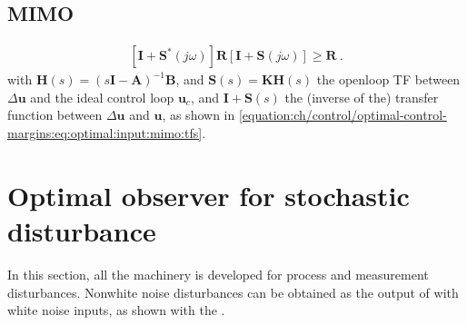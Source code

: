 \documentclass[letterpaper,10pt,english]{jupyterBook}
\begin{document}
\subsection{MIMO}
\label{\detokenize{ch/control/optimal-control-margins:mimo}}\label{\detokenize{ch/control/optimal-control-margins:control-optimal-margins-mimo}}\begin{equation*}
\begin{split}\left[ \mathbf{I} + \mathbf{S}^*(j \omega) \right] \mathbf{R} \left[ \mathbf{I} + \mathbf{S}(j \omega) \right] \ge \mathbf{R} \ .\end{split}
\end{equation*}
\sphinxAtStartPar
with \(\mathbf{H}(s) = (s \mathbf{I} - \mathbf{A})^{-1} \mathbf{B}\), and \(\mathbf{S}(s) = \mathbf{K} \mathbf{H}(s)\) the open\sphinxhyphen{}loop TF between \(\Delta \mathbf{u}\) and the ideal control loop \(\mathbf{u}_c\), and \(\mathbf{I} + \mathbf{S}(s)\) the (inverse of the) transfer function between \(\Delta \mathbf{u}\) and \(\mathbf{u}\), as shown in \eqref{equation:ch/control/optimal-control-margins:eq:optimal:input:mimo:tfs}.

\sphinxstepscope


\section{Optimal observer for stochastic disturbance}
\label{\detokenize{ch/control/optimal-control-observer-stochastic:optimal-observer-for-stochastic-disturbance}}\label{\detokenize{ch/control/optimal-control-observer-stochastic:control-optimal-observer-stochastic}}\label{\detokenize{ch/control/optimal-control-observer-stochastic::doc}}
\sphinxAtStartPar
In this section, all the machinery is developed for  process and measurement disturbances.
Non\sphinxhyphen{}white noise disturbances can be obtained as the output of  with white noise inputs, as shown with the {\hyperref[\detokenize{ch/system-theory/shape-filter:system-theory-shape-filter-augmented-system}]{}}.
\end{document}

